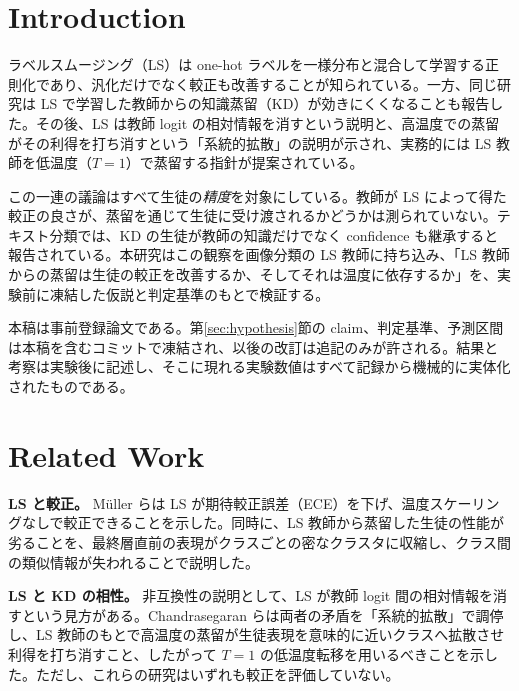 \documentclass[journal,article,submit,moreauthors]{Definitions/mdpi}
\begin{document}
\section{Introduction}

ラベルスムージング（LS）は one-hot ラベルを一様分布と混合して学習する正則化であり、汎化だけでなく較正も改善することが知られている\cite[s1.p2]{mller-2019-when}。一方、同じ研究は LS で学習した教師からの知識蒸留（KD）が効きにくくなることも報告した\cite[s1.p1]{mller-2019-when}。その後、LS は教師 logit の相対情報を消すという説明\cite[s4.p1]{shen-2021-label}と、高温度での蒸留がその利得を打ち消すという「系統的拡散」の説明\cite[s2.p1]{chandrasegaran-2022-revisiting}が示され、実務的には LS 教師を低温度（$T=1$）で蒸留する指針が提案されている\cite[s2.p2]{chandrasegaran-2022-revisiting}。

この一連の議論はすべて生徒の\emph{精度}を対象にしている。教師が LS によって得た較正の良さが、蒸留を通じて生徒に受け渡されるかどうかは測られていない。テキスト分類では、KD の生徒が教師の知識だけでなく confidence も継承すると報告されている\cite[s3.p1]{sultan-2023-knowledge}。本研究はこの観察を画像分類の LS 教師に持ち込み、「LS 教師からの蒸留は生徒の較正を改善するか、そしてそれは温度に依存するか」を、実験前に凍結した仮説と判定基準のもとで検証する。

本稿は事前登録論文である。第\ref{sec:hypothesis}節の claim、判定基準、予測区間は本稿を含むコミットで凍結され、以後の改訂は追記のみが許される。結果と考察は実験後に記述し、そこに現れる実験数値はすべて記録から機械的に実体化されたものである。

\section{Related Work}

\textbf{LS と較正。} Müller らは LS が期待較正誤差（ECE）を下げ、温度スケーリングなしで較正できることを示した\cite[s1.p2]{mller-2019-when}。同時に、LS 教師から蒸留した生徒の性能が劣ることを、最終層直前の表現がクラスごとの密なクラスタに収縮し、クラス間の類似情報が失われることで説明した\cite[s1.p1]{mller-2019-when}。

\textbf{LS と KD の相性。} 非互換性の説明として、LS が教師 logit 間の相対情報を消すという見方がある\cite[s4.p1]{shen-2021-label}。Chandrasegaran らは両者の矛盾を「系統的拡散」で調停し、LS 教師のもとで高温度の蒸留が生徒表現を意味的に近いクラスへ拡散させ利得を打ち消すこと\cite[s2.p1]{chandrasegaran-2022-revisiting}、したがって $T=1$ の低温度転移を用いるべきこと\cite[s2.p2]{chandrasegaran-2022-revisiting}を示した。ただし、これらの研究はいずれも較正を評価していない。
\end{document}
